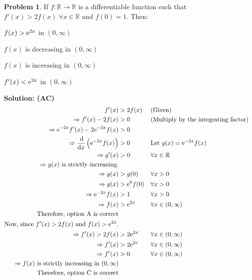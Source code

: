 \documentclass[14]{article}
\theoremstyle{definition}
\newtheorem{prob}{Problem}
\theoremstyle{case}
\begin{document}
\begin{prob}
If $f : \mathbb{R} \to \mathbb{R}$ is a differentiable function such that $f'(x) > 2f(x) \; \forall x \in \mathbb{R}$ and $f(0) = 1$. Then:\\
\begin{enumerate*}[label=(\Alph*)]
\item $f(x) > {\rm e}^{2x}$ in $(0, \infty)$\\
\item $f(x)$ is decreasing in $(0, \infty)$\\
\item $f(x)$ is increasing in $(0, \infty)$\\
\item $f'(x) < {\rm e}^{2x}$ in $(0, \infty)$\\
\end{enumerate*}
\textbf{Solution: (AC)}\\
\begin{align*}
f'(x) &> 2f(x) && \text{(Given)}\\
\Rightarrow f'(x) - 2f(x) &> 0 && \text{(Multiply by the integrating factor)}\\ 
\Rightarrow {\rm e}^{-2x} f'(x) - 2 {\rm e}^{-2x} f(x) &> 0\\
\Rightarrow \dfrac{\dif}{\dif x}\left( {\rm e}^{-2x} f(x) \right) &> 0 && \text{Let } g(x) = {\rm e}^{-2x} f(x)\\
\Rightarrow g'(x) &> 0 && \forall x \in \mathbb{R}\\
\Rightarrow g(x) \text{ is strictly increasing.}\\
\Rightarrow g(x) &> g(0) && \forall x > 0\\
\Rightarrow g(x) &> {\rm e}^0 f(0) && \forall x > 0\\
\Rightarrow {\rm e}^{-2x} f(x) &> 1 && \forall x > 0\\
\Rightarrow f(x) &> {\rm e}^{2x} && \forall x \in (0, \infty)\\
\text{Therefore, option A is correct}\\
\text{Now, since } f'(x) > 2f(x) \text{ and } f(x) > {\rm e}^{2x},\\
\Rightarrow f'(x) > 2f(x) &> 2 {\rm e}^{2x} && \forall x \in (0, \infty)\\
\Rightarrow f'(x) &> 2{\rm e}^{2x} && \forall x \in (0, \infty)\\
\Rightarrow f'(x) &> 0 && \forall x \in (0, \infty)\\ 
\Rightarrow f(x) \text{ is strictly increasing in } (0, \infty)\\
\text{Therefore, option C is correct}
\end{align*}
\end{prob}
\pagebreak
\end{document}
